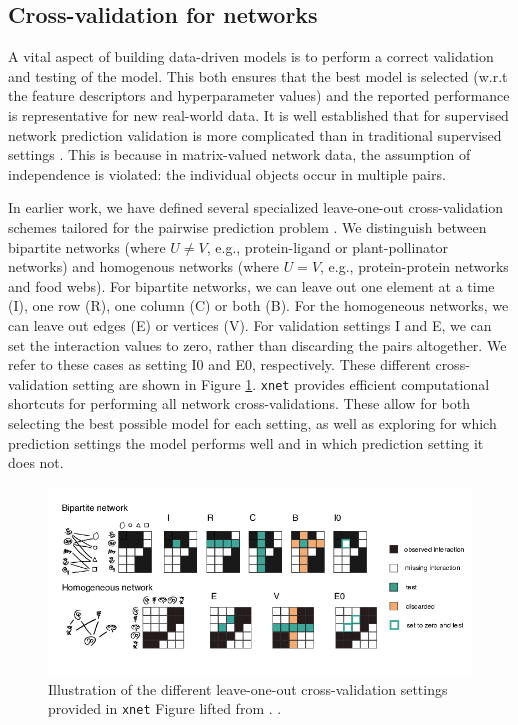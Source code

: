 \documentclass[
]{article}
\begin{document}
\hypertarget{cross-validation-for-networks}{%
\subsection{Cross-validation for
networks}\label{cross-validation-for-networks}}

A vital aspect of building data-driven models is to perform a correct
validation and testing of the model. This both ensures that the best
model is selected (w.r.t the feature descriptors and hyperparameter
values) and the reported performance is representative for new
real-world data. It is well established that for supervised network
prediction validation is more complicated than in traditional supervised
settings \citep{Park2012, Schrynemackers2013, Pahikkala2015}. This is
because in matrix-valued network data, the assumption of independence is
violated: the individual objects occur in multiple pairs.

In earlier work, we have defined several specialized leave-one-out
cross-validation schemes tailored for the pairwise prediction problem
\citep{Stock2018cvshortcuts}. We distinguish between bipartite networks
(where \(U\ne V\), e.g., protein-ligand or plant-pollinator networks)
and homogenous networks (where \(U = V\), e.g., protein-protein networks
and food webs). For bipartite networks, we can leave out one element at
a time (I), one row (R), one column (C) or both (B). For the homogeneous
networks, we can leave out edges (E) or vertices (V). For validation
settings I and E, we can set the interaction values to zero, rather than
discarding the pairs altogether. We refer to these cases as setting I0
and E0, respectively. These different cross-validation setting are shown
in Figure \ref{fig:CV}. \texttt{xnet} provides efficient computational
shortcuts for performing all network cross-validations. These allow for
both selecting the best possible model for each setting, as well as
exploring for which prediction settings the model performs well and in
which prediction setting it does not.

\begin{figure}
\centering
\includegraphics{Fig_settings.png}
\caption{Illustration of the different leave-one-out cross-validation
settings provided in \texttt{xnet} Figure lifted from
\citet{Stock2018cvshortcuts}. .\label{fig:CV}}
\end{figure}
\end{document}
